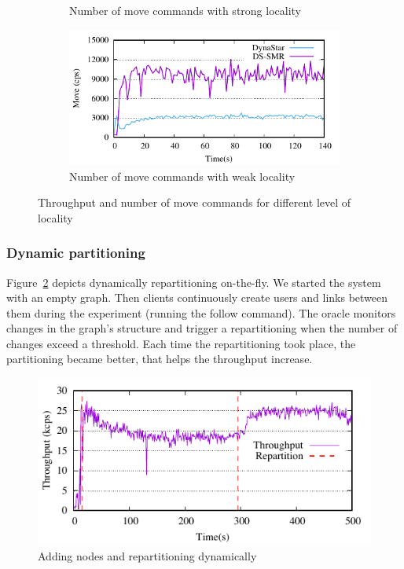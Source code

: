 \begin{figure}[ht!]
\begin{subfigure}[b]{0.45\textwidth}
    \caption{Number of move commands with strong locality}
  \end{subfigure}
  \begin{subfigure}[b]{0.45\textwidth}
    \centering
    \includegraphics[width=0.95\columnwidth]{figures/experiments/dynastar-vs-dssmr-4p-5-move}
    \caption{Number of move commands with weak locality}
  \end{subfigure}
  \caption{Throughput and number of move commands for different level of locality}
  \label{fig:motivation}
\end{figure}

\subsubsection{Dynamic partitioning}
Figure~\ref{fig:dynamic_load_tput} depicts dynamically repartitioning on-the-fly.
We started the system with an empty graph. Then clients continuously create users and links between them
during the experiment (running the follow command).  The oracle monitors changes in the graph's structure and 
trigger a repartitioning when the number of changes exceed a threshold.
Each time the repartitioning took place, the partitioning became better, that helps the throughput increase. 

\begin{figure}[ht]
	\includegraphics{figures/experiments/dynamicload-tp-move-4p}
	\caption{Adding nodes and repartitioning dynamically}
	\label{fig:dynamic_load_tput}
\end{figure}

